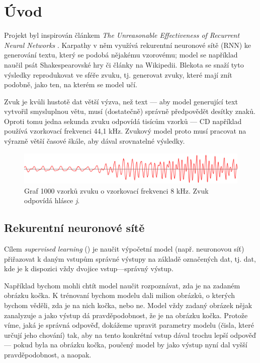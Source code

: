 \documentclass[a4]{article}
\begin{document}
\section{Úvod}
Projekt byl inspirován článkem \textit{The Unreasonable Effectiveness of Recurrent Neural Networks} \cite{unreasonable}. Karpathy v něm využívá rekurentní neuronové sítě (RNN) ke generování textu, který se podobá nějakému vzorovému; model se například naučil psát Shakespearovské hry či články na Wikipedii. Blekota se snaží tyto výsledky reprodukovat ve sféře zvuku, tj. generovat zvuky, které mají znít podobně, jako ten, na kterém se model učí.

Zvuk je kvůli hustotě dat větší výzva, než text --- aby model generující text vytvořil smysluplnou větu, musí (dostatečně) správně předpovědět desítky znaků. Oproti tomu jedna sekunda zvuku odpovídá tisícům vzorků --- CD například používá vzorkovací frekvenci 44,1 kHz. Zvukový model proto musí pracovat na výrazně větší časové škále, aby dával srovnatelné výsledky.

\begin{figure}[h]
\centering
\includegraphics[width=\textwidth]{voice_example}
\caption{Graf 1000 vzorků zvuku o vzorkovací frekvenci 8 kHz. Zvuk odpovídá hlásce \textit{j}.}
\end{figure}

\subsection{Rekurentní neuronové sítě}
Cílem \textit{supervised learning} () je naučit výpočetní model (např. neuronovou síť) přiřazovat k daným vstupům správné výstupy na základě označených dat, tj. dat, kde je k dispozici vždy dvojice vstup---správný výstup.

Například bychom mohli chtít model naučit rozpoznávat, zda je na zadaném obrázku kočka. K trénovaní bychom modelu dali milion obrázků, o kterých bychom věděli, zda je na nich kočka, nebo ne. Model vždy zadaný obrázek nějak zanalyzuje a jako výstup dá pravděpodobnost, že je na obrázku kočka. Protože víme, jaká je správná odpověď, dokážeme upravit parametry modelu (čisla, které určují jeho chování) tak, aby na tento konkrétní vstup dával trochu lepší odpověď --- pokud byla na obrázku kočka, poučený model by jako výstup nyní dal vyšší pravděpodobnost, a naopak.
\end{document}
